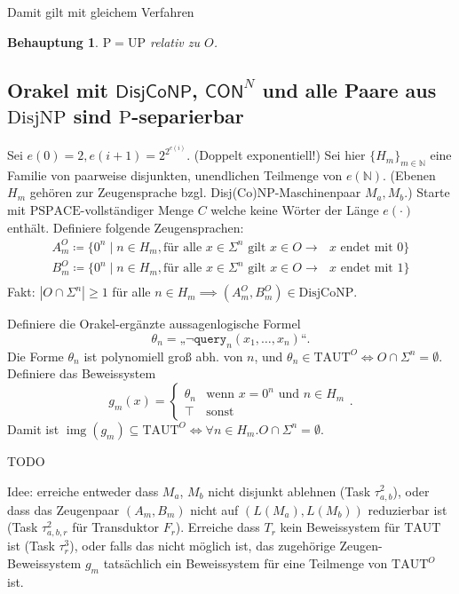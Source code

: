 \documentclass[nofonts]{uebung}
\newtheorem{claim}[theorem]{Behauptung}
\def\P{\ensuremath{\mathrm{P}}}
\def\UP{\ensuremath{\mathrm{UP}}}
\def\DisjNP{\ensuremath{\mathrm{DisjNP}}}
\def\DisjCoNP{\ensuremath{\mathrm{DisjCoNP}}}
\def\TAUT{\ensuremath{\mathrm{TAUT}}}
\DeclareMathOperator{\img}{img}
\def\hDisjCoNP{\ensuremath{\mathsf{DisjCoNP}}}
\def\hCON{\ensuremath{\mathsf{CON}}}
\begin{document}
Damit gilt mit gleichem Verfahren

\begin{claim}
    $\P=\UP$ relativ zu $O$.
\end{claim}

\clearpage
\subsection*{Orakel mit $\hDisjCoNP$, $\hCON^N$ und alle Paare aus $\DisjNP$ sind $\P$-separierbar}
\setcounter{theorem}{0}

Sei $e(0)=2, e(i+1)=2^{2^{e(i)}}$. (Doppelt exponentiell!) Sei hier $\{H_m\}_{m\in\mathbb N}$ eine Familie von paarweise disjunkten, unendlichen Teilmenge von $e(\mathbb N)$. (Ebenen $H_m$ gehören zur Zeugensprache bzgl. Disj(Co)NP-Maschinenpaar $M_a, M_b$.)
Starte mit $\mathrm{PSPACE}$-vollständiger Menge $C$ welche keine Wörter der Länge $e(\cdot)$ enthält.
Definiere folgende Zeugensprachen:
\begin{gather*}
    A_m^O \coloneqq \{ 0^n \mid n\in H_m, \text{für alle $x\in \Sigma^{n}$ gilt } x\in O \rightarrow \text{ $x$ endet mit $0$} \}\\
    B_m^O \coloneqq \{ 0^n \mid n\in H_m, \text{für alle $x\in \Sigma^{n}$ gilt } x\in O \rightarrow \text{ $x$ endet mit $1$} \}\\
\end{gather*}
Fakt: $|O\cap \Sigma^n|\geq 1$ für alle $n\in H_m \implies (A_m^O, B_m^O)\in\DisjCoNP$.
\medskip

\medskip
Definiere die Orakel-ergänzte aussagenlogische Formel
\[ \theta_n = „\neg\mathtt{query}_n(x_1, \dots, x_n)“. \]
Die Forme $\theta_n$ ist polynomiell groß abh. von $n$, und $\theta_n\in\TAUT^O \iff O\cap\Sigma^n=\emptyset$.
Definiere das Beweissystem
\[ g_m(x) = \begin{cases} \theta_n & \text{wenn $x=0^n$ und $n\in H_m$} \\ \top & \text{sonst} \end{cases}. \]
Damit ist $\img(g_m)\subseteq \TAUT^O \iff \forall n\in H_m. O\cap\Sigma^n=\emptyset$. 

TODO
\medskip

Idee: erreiche entweder dass $M_a$, $M_b$ nicht disjunkt ablehnen (Task $\tau^2_{a,b}$), oder dass das Zeugenpaar $(A_m,B_m)$ nicht auf $(L(M_a),L(M_b))$ reduzierbar ist (Task $\tau^2_{a,b,r}$ für Transduktor $F_r$).
Erreiche dass $T_r$ kein Beweissystem für $\TAUT$ ist (Task $\tau^3_{r}$), oder falls das nicht möglich ist, das zugehörige Zeugen-Beweissystem $g_m$ tatsächlich ein Beweissystem für eine Teilmenge von $\TAUT^O$ ist.
\end{document}
